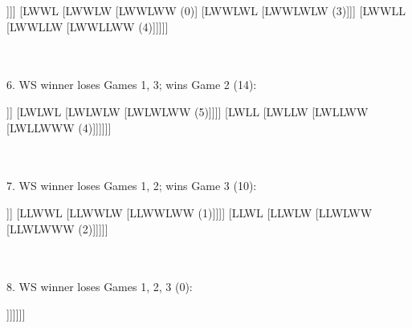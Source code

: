 \documentclass[11pt, oneside]{article}
\begin{document}
\begin{forest}
		[LWW
			[LWWW
				[LWWWW (4)]
				[LWWWL
					[LWWWLW (7)]
					[LWWWLL
						[LWWWLLW (0)]]]]
			[LWWL
				[LWWLW
					[LWWLWW (0)]
					[LWWLWL
						[LWWLWLW (3)]]]
				[LWWLL
					[LWWLLW
						[LWWLLWW (4)]]]]]
\end{forest}
\\
\\

6. WS winner loses Games 1, 3; wins Game 2 (14):

\begin{forest}
		[LWL
			[LWLW
				[LWLWW
					[LWLWWW (4)]
					[LWLWWL
						[LWLWWLW (1)]]]
				[LWLWL
					[LWLWLW
						[LWLWLWW (5)]]]]
			[LWLL
				[LWLLW
					[LWLLWW
						[LWLLWWW (4)]]]]]]
\end{forest}
\\
\\

7. WS winner loses Games 1, 2; wins Game 3 (10):

\begin{forest}
		[LLW
			[LLWW
				[LLWWW
					[LLWWWW (3)]
					[LLWWWL
						[LLWWWLW (4)]]]
				[LLWWL
					[LLWWLW
						[LLWWLWW (1)]]]]
			[LLWL
				[LLWLW
					[LLWLWW
						[LLWLWWW (2)]]]]]
\end{forest}
\\
\\

8. WS winner loses Games 1, 2, 3 (0):

\begin{forest}
		[LLL
			[LLLW
				[LLLWW
					[LLLWWW
						[LLLWWWW (0)]]]]]]]
\end{forest}
\end{document}
